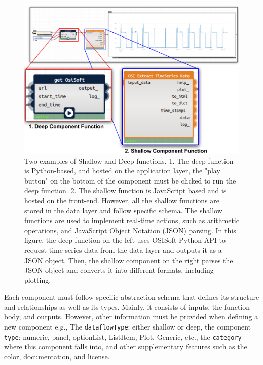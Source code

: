 \documentclass{scsSimAUDPaperFormat}
\begin{document}
\begin{figure}[h]
\centering
\includegraphics[width=\columnwidth]{imgs/shallow_deep.png}
\caption{Two examples of Shallow and Deep functions. 1. The deep function is Python-based, and hosted on the application layer, the "play button" on the bottom of the component must be clicked to run the deep function. 2. The shallow function is JavaScript based and is hosted on the front-end. However, all the shallow functions are stored in the data layer and follow specific schema. The shallow functions are used to implement real-time actions, such as arithmetic operations, and JavaScript Object Notation (JSON) parsing. In this figure, the deep function on the left uses OSISoft Python API to request time-series data from the data layer and outputs it as a JSON object. Then, the shallow component on the right parses the JSON object and converts it into different formats, including plotting.}
\label{fig:deep-shallow}
\end{figure}

Each component must follow specific abstraction schema that defines its structure and relationships as well as its types. Mainly, it consists of inputs, the function body, and outputs. However, other information must be provided when defining a new component e.g., The \texttt{dataflowType}: either shallow or deep, the component \texttt{type}: numeric, panel, optionList, ListItem, Plot, Generic, etc., the \texttt{category} where this component falls into, and other supplementary features such as the color, documentation, and license. 
\end{document}
